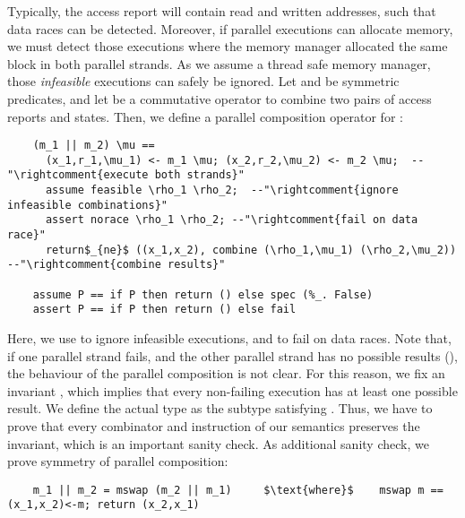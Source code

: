 \documentclass[sn-mathphys,Numbered]{sn-jnl}
\theoremstyle{thmstyleone}%
\theoremstyle{definition}%
\theoremstyle{thmstylethree}%
\begin{document}
  Typically, the access report will contain read and written addresses, such that data races can be detected.
  Moreover, if parallel executions can allocate memory, we must detect those
  executions where the memory manager allocated the same block in both parallel strands.
  As we assume a thread safe memory manager, those \emph{infeasible} executions can safely be ignored.
  Let  and  be symmetric predicates,
  and let  be a commutative operator to
  combine two pairs of access reports and states. Then, we define a parallel composition operator for :
  \begin{lstlisting}
    (m_1 || m_2) \mu ==
      (x_1,r_1,\mu_1) <- m_1 \mu; (x_2,r_2,\mu_2) <- m_2 \mu;  --"\rightcomment{execute both strands}"
      assume feasible \rho_1 \rho_2;  --"\rightcomment{ignore infeasible combinations}"
      assert norace \rho_1 \rho_2; --"\rightcomment{fail on data race}"
      return$_{ne}$ ((x_1,x_2), combine (\rho_1,\mu_1) (\rho_2,\mu_2))  --"\rightcomment{combine results}"

    assume P == if P then return () else spec (%_. False)
    assert P == if P then return () else fail
  \end{lstlisting}
  Here, we use  to ignore infeasible executions, and  to fail on data races.
  Note that, if one parallel strand fails, and the other parallel strand has no possible
  results (), the behaviour of the parallel composition is not clear.
  For this reason, we fix an invariant ,
  which implies that every non-failing execution has at least one possible result.
  We define the actual type  as the subtype satisfying .
  Thus, we have to prove that every combinator and instruction of our semantics
  preserves the invariant, which is an important sanity check.
  As additional sanity check, we prove symmetry of parallel composition:
  \begin{lstlisting}
    m_1 || m_2 = mswap (m_2 || m_1)     $\text{where}$    mswap m == (x_1,x_2)<-m; return (x_2,x_1)
  \end{lstlisting}
\end{document}
